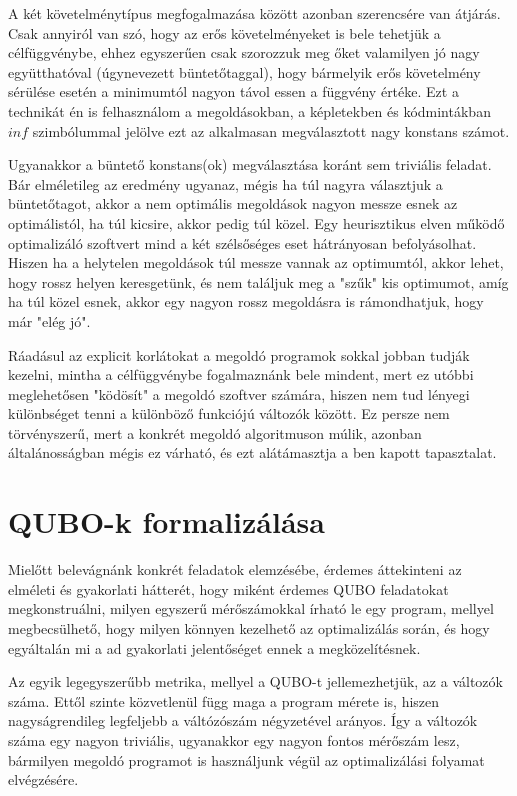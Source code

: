 A két követelménytípus megfogalmazása között azonban szerencsére van átjárás. Csak annyiról van szó, hogy az erős követelményeket is bele tehetjük a célfüggvénybe, ehhez egyszerűen csak szorozzuk meg őket valamilyen jó nagy együtthatóval (úgynevezett büntetőtaggal), hogy bármelyik erős követelmény sérülése esetén a minimumtól nagyon távol essen a függvény értéke.
Ezt a technikát én is felhasználom a megoldásokban, a képletekben és kódmintákban $inf$ szimbólummal jelölve ezt az alkalmasan megválasztott nagy konstans számot.

Ugyanakkor a büntető konstans(ok) megválasztása koránt sem triviális feladat. Bár elméletileg az eredmény ugyanaz, mégis ha túl nagyra választjuk a büntetőtagot, akkor a nem optimális megoldások nagyon messze esnek az optimálistól, ha túl kicsire, akkor pedig túl közel. Egy heurisztikus elven működő optimalizáló szoftvert mind a két szélsőséges eset hátrányosan befolyásolhat. Hiszen ha a helytelen megoldások túl messze vannak az optimumtól, akkor lehet, hogy rossz helyen keresgetünk, és nem találjuk meg a "szűk" kis optimumot, amíg ha túl közel esnek, akkor egy nagyon rossz megoldásra is rámondhatjuk, hogy már "elég jó".

Ráadásul az explicit korlátokat a megoldó programok sokkal jobban tudják kezelni, mintha a célfüggvénybe fogalmaznánk bele mindent, mert ez utóbbi meglehetősen "ködösít" a megoldó szoftver számára, hiszen nem tud lényegi különbséget tenni a különböző funkciójú változók között. Ez persze nem törvényszerű, mert a konkrét megoldó algoritmuson múlik, azonban általánosságban mégis ez várható, és ezt alátámasztja a ben kapott tapasztalat.

\section{QUBO-k formalizálása}\label{sec:QUBOform}

Mielőtt belevágnánk konkrét feladatok elemzésébe, érdemes áttekinteni az elméleti és gyakorlati hátterét, hogy miként érdemes QUBO feladatokat megkonstruálni, milyen egyszerű mérőszámokkal írható le egy program, mellyel megbecsülhető, hogy milyen könnyen kezelhető az optimalizálás során, és hogy egyáltalán mi a ad gyakorlati jelentőséget ennek a megközelítésnek.

Az egyik legegyszerűbb metrika, mellyel a QUBO-t jellemezhetjük, az a változók száma. Ettől szinte közvetlenül függ maga a program mérete is, hiszen nagyságrendileg legfeljebb a váltózószám négyzetével arányos. Így a változók száma egy nagyon triviális, ugyanakkor egy nagyon fontos mérőszám lesz, bármilyen megoldó programot is használjunk végül az optimalizálási folyamat elvégzésére.

